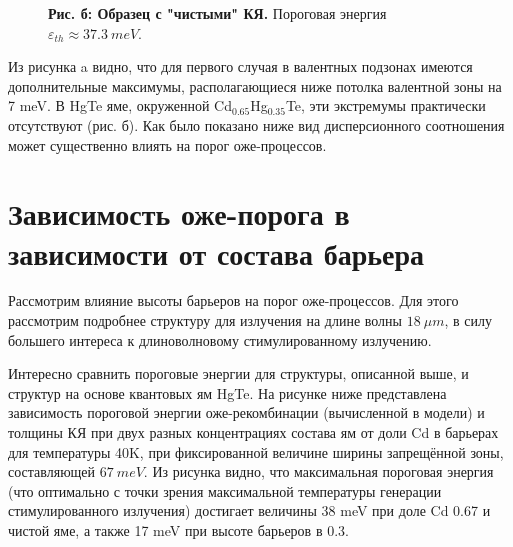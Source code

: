\documentclass[../main.tex]{subfiles}
\begin{document}
\begin{figure}[h!]
\begin{minipage}[h]{0.49\linewidth}
\begin{center}
                    \textbf{Рис. б: Образец с "чистыми" КЯ.} Пороговая энергия 
                        $\varepsilon_{th} \approx 37.3~meV$.
                \end{center}
            \end{minipage}
        \end{figure}

        Из рисунка a видно, что для первого случая в валентных подзонах имеются дополнительные максимумы, располагающиеся ниже потолка валентной 
        зоны на 7 meV. В HgTe яме, окруженной Cd${}_{0.65}$Hg${}_{0.35}$Te, эти экстремумы практически отсутствуют (рис. б). Как было показано ниже
        вид дисперсионного соотношения может существенно влиять на порог оже-процессов.
        \newpage

        \section{Зависимость оже-порога в зависимости от состава барьера}

        Рассмотрим влияние высоты барьеров на порог оже-процессов. Для 
        этого рассмотрим подробнее структуру для излучения на длине волны $18~\mu m$,
        в силу большего интереса к длиноволновому стимулированному излучению.

        Интересно сравнить пороговые энергии для структуры, описанной выше, и структур на основе квантовых ям HgTe. На рисунке ниже представлена 
        зависимость пороговой энергии оже-рекомбинации (вычисленной в модели) и толщины КЯ при двух разных концентрациях состава ям
        от доли Cd в барьерах для температуры 40K, 
        при фиксированной величине ширины запрещённой зоны, составляющей $67~meV$. Из рисунка видно, что максимальная пороговая энергия (что оптимально 
        с точки зрения максимальной температуры генерации стимулированного излучения) достигает величины 38 meV при доле Cd 0.67 и чистой яме, а также 
        17 meV при высоте барьеров в 0.3.
\end{document}
